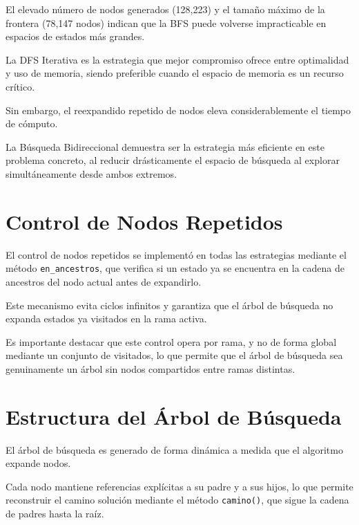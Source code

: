 \documentclass{article}
\begin{document}
El elevado número de nodos generados (128,223) y el tamaño máximo de
la frontera (78,147 nodos) indican que la BFS puede volverse
impracticable en espacios de estados más grandes.

La DFS Iterativa es la estrategia que mejor compromiso ofrece entre
optimalidad y uso de memoria, siendo preferible cuando el espacio de
memoria es un recurso crítico.

Sin embargo, el reexpandido repetido de nodos eleva considerablemente
el tiempo de cómputo.

La Búsqueda Bidireccional demuestra ser la estrategia más eficiente
en este problema concreto, al reducir drásticamente el espacio de
búsqueda al explorar simultáneamente desde ambos extremos.


\section{Control de Nodos Repetidos}

El control de nodos repetidos se implementó en todas las estrategias
mediante el método \texttt{en\_ancestros}, que verifica si un estado
ya se encuentra en la cadena de ancestros del nodo actual antes de
expandirlo.

Este mecanismo evita ciclos infinitos y garantiza que el árbol de
búsqueda no expanda estados ya visitados en la rama activa.

Es importante destacar que este control opera por rama, y no de forma
global mediante un conjunto de visitados, lo que permite que el árbol
de búsqueda sea genuinamente un árbol sin nodos compartidos entre
ramas distintas.


\section{Estructura del Árbol de Búsqueda}

El árbol de búsqueda es generado de forma dinámica a medida que el
algoritmo expande nodos.

Cada nodo mantiene referencias explícitas a su padre y a sus hijos,
lo que permite reconstruir el camino solución mediante el método
\texttt{camino()}, que sigue la cadena de padres hasta la raíz.
\end{document}
